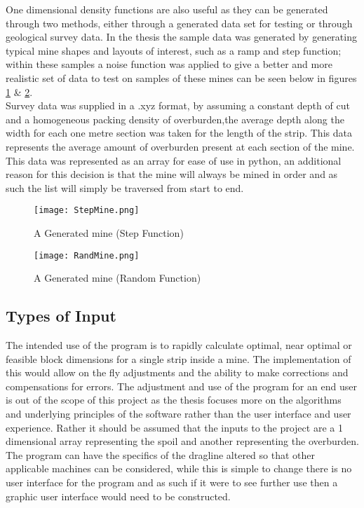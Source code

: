 One dimensional density functions are also useful as they can be generated through two methods, either through a generated data set for testing or through geological survey data. In the thesis the sample data was generated by generating typical mine shapes and layouts of interest, such as a ramp and step function; within these samples a noise function was applied to give a better and more realistic set of data to test on samples of these mines can be seen below in figures \ref{Minestep} \& \ref{MineRand}. 
\\
Survey data was supplied in a .xyz format, by assuming a constant depth of cut and a homogeneous packing density of overburden,the average depth along the width for each one metre section was taken for the length of the strip. This data represents the average amount of overburden present at each section of the mine.  This  data was represented as an array for ease of use in python, an additional reason for this decision is that the mine will always be mined in order \cite{MiningHandbook} and as such the list will simply be traversed from start to end.  

\begin{figure}[h]
\caption{A Generated mine (Step Function)}
\label{Minestep}
\texttt{[image: StepMine.png]}
\end{figure}
\begin{figure}[h]
\caption{A Generated mine (Random Function)}
\label{MineRand}
\texttt{[image: RandMine.png]}
\end{figure}




\subsection{Types of Input}
The intended use of the program is to rapidly calculate optimal, near optimal or feasible block dimensions for a single strip inside a mine.  The implementation of this would allow on the fly adjustments and the ability to make corrections and compensations for errors. The adjustment and use of the program for an end user is out of the scope of this project as the thesis focuses more on the algorithms and underlying principles of the software rather than the user interface and user experience. Rather it should be assumed that the inputs to the project are a 1 dimensional array representing the spoil and another representing the overburden. The program can have the specifics of the dragline altered so that other applicable machines can be considered, while this is simple to change there is no user interface for the program and as such if it were to see further use then a graphic user interface would need to be constructed. \\


